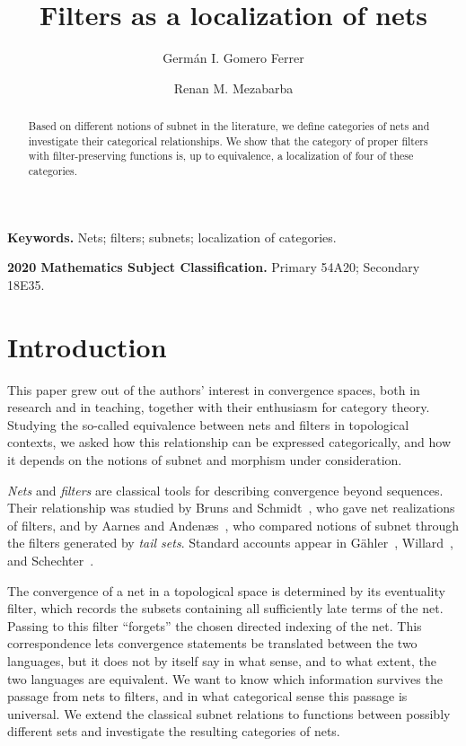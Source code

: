 \documentclass[11pt,a4paper]{article}
\title{Filters as a localization of nets}
\author{Germ\'an I. Gomero Ferrer \and Renan M. Mezabarba}
\date{}
\theoremstyle{definition}
\theoremstyle{remark}
\begin{document}
\maketitle
\begin{abstract}
Based on different notions of subnet in the literature, we define
categories of nets and investigate their categorical relationships.
We show that the category of proper filters with filter-preserving
functions is, up to equivalence, a localization of four of these
categories.
\end{abstract}

\noindent\textbf{Keywords.} Nets; filters; subnets; localization of categories.

\smallskip
\noindent\textbf{2020 Mathematics Subject Classification.}
Primary 54A20; Secondary 18E35.

\section*{Introduction}
This paper grew out of the authors' interest in convergence spaces,
both in research and in teaching, together with their enthusiasm for
category theory. Studying the so-called equivalence between nets and
filters in topological contexts, we asked how this relationship can be
expressed categorically, and how it depends on the notions of subnet
and morphism under consideration.

\emph{Nets} and \emph{filters} are classical tools for describing convergence beyond
sequences. Their relationship was studied by
Bruns and Schmidt~\cite{BS}, who gave net realizations of filters, and by
Aarnes and Anden\ae s~\cite{AA}, who compared notions of subnet through the
filters generated by \emph{tail sets}. Standard accounts appear in
G\"ahler~\cite{Gaehler}, Willard~\cite{Willard}, and
Schechter~\cite[Chapter 7]{Schechter}.

The convergence of a net in a topological space is determined by its
eventuality filter, which records the subsets containing all sufficiently
late terms of the net. Passing to this filter ``forgets'' the chosen
directed indexing of the net. This correspondence lets convergence
statements be translated between the two languages, but it does not by
itself say in what sense, and to what extent, the two languages are
equivalent. We want to know which information survives the passage
from nets to filters, and in what categorical sense this passage is
universal.
We extend the classical subnet relations to functions between possibly
different sets and investigate the resulting categories of nets.
\end{document}
